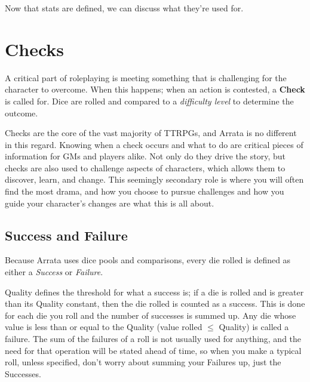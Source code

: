 \documentclass[../main.tex]{subfiles}
\begin{document}
    Now that stats are defined, we can discuss what they're used for.

    \section{Checks}

    A critical part of roleplaying is meeting something that is challenging for the character to overcome. When this happens; when an action is contested, a \textbf{Check} is called for. Dice are rolled and compared to a {\em difficulty level} to determine the outcome.

    Checks are the core of the vast majority of TTRPGs, and Arrata is no different in this regard. Knowing when a check occurs and what to do are critical pieces of information for GMs and players alike. Not only do they drive the story, but checks are also used to challenge aspects of characters, which allows them to discover, learn, and change. This seemingly secondary role is where you will often find the most drama, and how you choose to pursue challenges and how you guide your character's changes are what this is all about.

    \subsection{Success and Failure}

    Because Arrata uses dice pools and comparisons, every die rolled is defined as either a \emph{Success} or \emph{Failure}. 
    
    Quality defines the threshold for what a success is; if a die is rolled and is greater than its Quality constant, then the die rolled is counted as a success. This is done for each die you roll and the number of successes is summed up. Any die whose value is less than or equal to the Quality (value rolled $\leq$ Quality) is called a failure. The sum of the failures of a roll is not usually used for anything, and the need for that operation will be stated ahead of time, so when you make a typical roll, unless specified, don't worry about summing your Failures up, just the Successes.
    
\end{document}
